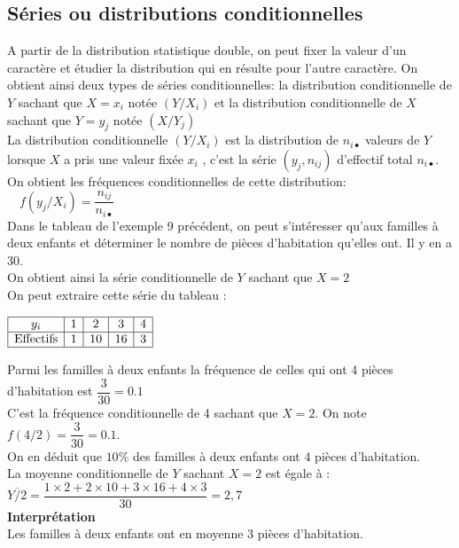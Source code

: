 \subsection*{Séries ou distributions conditionnelles}
A partir de la distribution statistique double, on peut fixer la valeur d’un caractère et étudier la distribution qui en résulte pour l’autre caractère. On obtient ainsi deux types de séries conditionnelles: la distribution conditionnelle de $Y$ sachant que $X= x_i$ notée $(Y /X_i)$ et la distribution conditionnelle de $X$ sachant que $Y= y_j$ notée $(X/Y_j)$\\
La distribution conditionnelle $(Y /X_i)$  est la distribution de  $ n_{i \bullet} $ valeurs de $Y$ lorsque $X$ a pris une valeur fixée $x_i$ , c’est la série $(y_j,n_{i j})$ d’effectif total $n_{i \bullet}$.\\
On obtient les fréquences conditionnelles  de cette distribution:     $ \quad f(y_j/X_i)=\dfrac{n_{i j}}{n_{i \bullet}} $\\
Dans le tableau de l’exemple 9 précédent, on peut s’intéresser qu’aux familles à deux enfants et déterminer le nombre de pièces d’habitation qu’elles ont. Il y en a $30$.\\On obtient ainsi la série conditionnelle de $Y$ sachant que $X=2$\\
On peut extraire cette série du tableau :


   $\begin{array}{|c|c|c|c|c|}
\hline
  y_i & 1& 2 & 3&  4   \\
 \hline
\text{Effectifs} & 1 & 10 & 16 & 3 \\
 \hline
\end{array}$

Parmi les familles à deux enfants la fréquence de
celles qui ont 4 pièces d’habitation est $ \dfrac{3}{30}=0.1 $\\
C’est la fréquence conditionnelle de 4 sachant que
$X=2$. On note $f(4/2)=\dfrac{3}{30}=0.1$.\\
On en déduit que $10\%$ des familles à deux enfants
ont 4 pièces d’habitation.\\
La moyenne conditionnelle de $Y$ sachant $X=2$ est  égale à :                                  $ \overline{Y/2}=\dfrac{1\times 2 +2\times 10 +3\times 16+ 4\times 3}{30} =2,7$\\

\textbf{Interprétation}\\
Les familles à deux enfants ont
en moyenne 3 pièces d’habitation.

